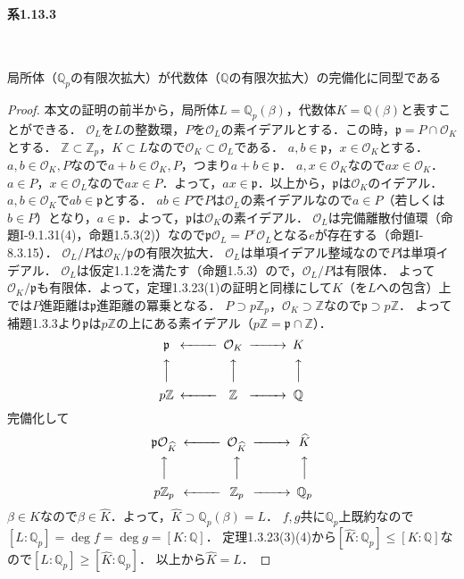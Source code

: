 \paragraph{系1.13.3}~
\begin{screen}
  局所体（$\mathbb{Q}_p$の有限次拡大）が代数体（$\mathbb{Q}$の有限次拡大）の完備化に同型である
\end{screen}
\begin{proof}
  本文の証明の前半から，局所体$L=\mathbb{Q}_p(\beta)$，代数体$K=\mathbb{Q}(\beta)$と表すことができる．
  $\mathcal{O}_L$を$L$の整数環，$P$を$\mathcal{O}_L$の素イデアルとする．この時，$\mathfrak{p}=P\cap\mathcal{O}_K$とする．
  $\mathbb{Z} \subset \mathbb{Z}_p$，$K \subset L$なので$\mathcal{O}_K \subset \mathcal{O}_L$である．
  $a,b\in\mathfrak{p}$，$x\in\mathcal{O}_K$とする．
  $a,b\in\mathcal{O}_K,P$なので$a+b\in\mathcal{O}_K,P$，つまり$a+b\in\mathfrak{p}$．
  $a,x\in\mathcal{O}_K$なので$ax\in\mathcal{O}_K$．
  $a\in P$，$x\in\mathcal{O}_L$なので$ax\in P$．よって，$ax\in\mathfrak{p}$．以上から，$\mathfrak{p}$は$\mathcal{O}_K$のイデアル．
  $a,b\in\mathcal{O}_K$で$ab\in \mathfrak{p}$とする．
  $ab\in P$で$P$は$\mathcal{O}_L$の素イデアルなので$a\in P$（若しくは$b\in P$）となり，$a\in\mathfrak{p}$．よって，$\mathfrak{p}$は$\mathcal{O}_K$の素イデアル．
  $\mathcal{O}_L$は完備離散付値環（命題I-9.1.31(4)，命題1.5.3(2)）なので$\mathfrak{p}\mathcal{O}_L=P^e\mathcal{O}_L$となる$e$が存在する（命題I-8.3.15）．
  $\mathcal{O}_L/P$は$\mathcal{O}_K/\mathfrak{p}$の有限次拡大．
  $\mathcal{O}_L$は単項イデアル整域なので$P$は単項イデアル．
  $\mathcal{O}_L$は仮定1.1.2を満たす（命題1.5.3）ので，$\mathcal{O}_L/P$は有限体．
  よって$\mathcal{O}_K/\mathfrak{p}$も有限体．よって，定理1.3.23(1)の証明と同様にして$K$（を$L$への包含）上では$P$進距離は$\mathfrak{p}$進距離の冪乗となる．
  $P\supset p\mathbb{Z}_p$，$\mathcal{O}_K\supset\mathbb{Z}$なので$\mathfrak{p}\supset p\mathbb{Z}$．
  よって補題1.3.3より$\mathfrak{p}$は$p\mathbb{Z}$の上にある素イデアル（$p\mathbb{Z}=\mathfrak{p}\cap\mathbb{Z}$）．
  \[
  \begin{CD}
    \mathfrak{p} @<<< \mathcal{O}_K @>>> K \\
    @AAA         @AAA               @AAA \\
    p\mathbb{Z}  @<<< \mathbb{Z}    @>>> \mathbb{Q}
  \end{CD}
  \]
  完備化して
  \[
  \begin{CD}
    \mathfrak{p}\mathcal{O}_{\widehat{K}}   @<<< \mathcal{O}_{\widehat{K}} @>>> \widehat{K}\\
    @AAA                              @AAA                     @AAA \\
    p\mathbb{Z}_p                     @<<< \mathbb{Z}_p        @>>> \mathbb{Q}_p
  \end{CD}
  \]
  $\beta\in K$なので$\beta\in\widehat{K}$．よって，$\widehat{K}\supset\mathbb{Q}_p(\beta)=L$．
  $f,g$共に$\mathbb{Q}_p$上既約なので$[L:\mathbb{Q}_p]=\deg f=\deg g=[K:\mathbb{Q}]$．
  定理1.3.23(3)(4)から$[\widehat{K}:\mathbb{Q}_p]\leq[K:\mathbb{Q}]$なので$[L:\mathbb{Q}_p]\geq[\widehat{K}:\mathbb{Q}_p]$．
  以上から$\widehat{K}=L$．
\end{proof}

